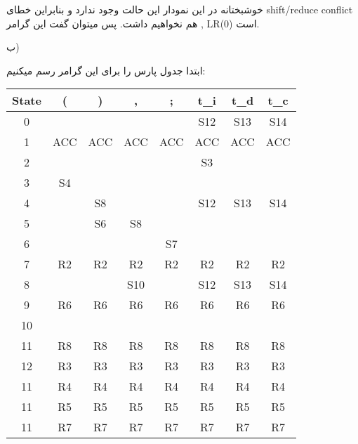 خوشبختانه در این نمودار این حالت وجود ندارد و بنابراین خطای shift/reduce conflict هم نخواهیم داشت. پس میتوان گفت این گرامر , LR(0) است.

ب)

ابتدا جدول پارس را برای این گرامر رسم میکنیم:

\begin{center}
\begin{latin}
\begin{tabular}{|c|c|c|c|c|c|c|c|}
\hline
State & (   & )                      & ,   & ;                      & t\_i                   & t\_d & t\_c \\ \hline
0     &     &                        &     &                        & S12                    & S13  & S14  \\ \hline
1     & ACC & ACC                    & ACC & ACC                    & ACC                    & ACC  & ACC  \\ \hline
2     &     &                        &     &                        & S3                     &      &      \\ \hline
3     & S4  &                        &     &                        &                        &      &      \\ \hline
4     &     & S8                     &     &                        & S12                    & S13  & S14  \\ \hline
5     &     & S6                     & S8  &                        &                        &      &      \\ \hline
6     &     &                        &     & S7                     &                        &      &      \\ \hline
7     & R2  & R2                     & R2  & R2                     & R2                     & R2   & R2   \\ \hline
8     &     &                        & S10 &                        & S12                    & S13  & S14  \\ \hline
9     & R6  & R6                     & R6  & R6                     & R6                     & R6   & R6   \\ \hline
10    &     &                        &     &                        &                        &      &      \\ \hline
11    & R8  & R8                     & R8  & R8                     & R8                     & R8   & R8   \\ \hline
12    & R3  & R3                     & R3  & R3                     & R3                     & R3   & R3   \\ \hline
11    & R4  & R4                     & R4  & R4                     & R4                     & R4   & R4   \\ \hline
11    & R5  & R5                     & R5  & R5                     & R5                     & R5   & R5   \\ \hline
11    & R7  & R7                     & R7  & R7                     & R7                     & R7   & R7   \\ \hline


\end{tabular}
\end{latin}
\end{center}
